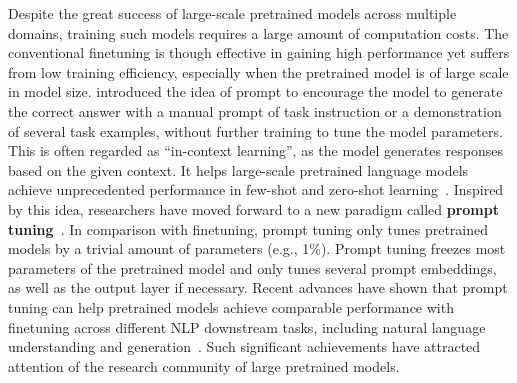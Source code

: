 \documentclass[11pt]{article}
\begin{document}
Despite the great success of large-scale pretrained models across multiple domains, training such models requires a large amount of computation costs. 
The conventional finetuning is though effective in gaining high performance yet suffers from low training efficiency, especially when the pretrained model is of large scale in model size. 
\citet{gpt3} introduced the idea of prompt to encourage the model to generate the correct answer with a manual prompt of task instruction or a demonstration of several task examples, without further training to tune the model parameters. 
This is often regarded as ``in-context learning'', as the model generates responses based on the given context. 
It helps large-scale pretrained language models achieve unprecedented performance in few-shot and zero-shot learning~\citep{gpt3, palm, t0, flan}. 
Inspired by this idea, researchers have moved forward to a new paradigm called \textbf{prompt tuning}~\citep{prefix_tuning, p_tuning, prompt_tuning, prompt_tuning_survey}. 
In comparison with finetuning, prompt tuning only tunes pretrained models by a trivial amount of parameters (e.g., 1\%). 
Prompt tuning freezes most parameters of the pretrained model and only tunes several prompt embeddings, as well as the output layer if necessary. Recent advances have shown that prompt tuning can help pretrained models achieve comparable performance with finetuning across different NLP downstream tasks, including natural language understanding and generation~\citep{p_tuning_v2, unified_view}. 
Such significant achievements have attracted attention of the research community of large pretrained models.
\end{document}
